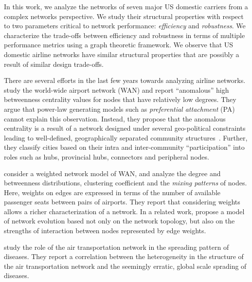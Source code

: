 \documentclass[10pt]{article}
\begin{document}
In this work, we analyze the networks of seven major US domestic carriers from a complex networks perspective. We study their structural properties with respect to two parameters critical to network performance: \textit{ef\mbox{}f\mbox{}iciency} and \textit{robustness}. We characterize the trade-offs between ef\mbox{}f\mbox{}iciency and robustness in terms of multiple performance metrics using a graph theoretic framework. We observe that US domestic airline networks have similar structural properties that are possibly a result of similar design trade-offs.%

There are several efforts in the last few years towards analyzing airline networks. %
\cite{guimera04a} study the world-wide airport network (WAN) and report ``anomalous'' high betweenness centrality values for nodes that have relatively low degrees. They argue that power-law generating models such as \textit{preferential attachment} (PA) cannot explain this observation. Instead, they propose that the anomalous centrality is a result of a network designed under several geo-political constraints leading to well-defined, geographically separated community structures~\citep{guimera05a}. Further, they classify cities based on their intra and inter-community ``participation'' into roles such as hubs, provincial hubs, connectors and peripheral nodes.

\cite{barrat04} consider a weighted network model of WAN, and analyze the degree and betweenness distributions, clustering coefficient and the \textit{mixing patterns} %
of nodes. Here, weights on edges are expressed in terms of the number of available passenger seats between pairs of airports. They report that considering weights allows a richer characterization of a network. In a related work, %
\cite{barthelemy05} propose a model of network evolution based not only on the network topology, but also on the strengths of interaction between nodes represented by edge weights.

\cite{colizza06} study the role of the air transportation network in the spreading pattern of diseases. They report a correlation between the heterogeneity in the structure of the air transportation network and the seemingly erratic, global scale sprading of diseases.
\end{document}
